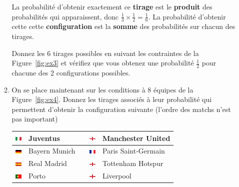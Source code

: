 \documentclass{../ficheTDTP}
\begin{document}
\begin{enumerate}
\begin{enumerate}
La probabilité d'obtenir exactement ce \textbf{tirage} est le \textbf{produit} des probabilités qui apparaissent, donc $\frac{1}{3} \times \frac{1}{2} = \frac{1}{6}$. 
La probabilité d'obtenir cette cette \textbf{configuration} est la \textbf{somme} des probabilités sur chacun des tirages.

Donnez les 6 tirages possibles en suivant les contraintes de la Figure~\ref{fig:ex3} et vérifiez que vous obtenez une probabilité $\frac{1}{2}$ pour chacune des 2 configurations possibles.

\item On se place maintenant sur les conditions à 8 équipes de la Figure~\ref{fig:ex4}. Donnez les tirages associés à leur probabilité qui permettent d'obtenir la configuration suivante (l'ordre des matchs n'est pas important)

\begin{tabular}{|clccl|}
\hline
\includegraphics[height=0.2cm]{flags/it.png} & Juventus & & \includegraphics[height=0.2cm]{flags/en.png} & Manchester United \\ \hline
\includegraphics[height=0.2cm]{flags/de.png} & Bayern Munich & & \includegraphics[height=0.2cm]{flags/fr.png} & Paris Saint-Germain \\ \hline
\includegraphics[height=0.2cm]{flags/es.png} & Real Madrid & & \includegraphics[height=0.2cm]{flags/en.png} & Tottenham Hotspur \\ \hline
\includegraphics[height=0.2cm]{flags/po.png} & Porto & & \includegraphics[height=0.2cm]{flags/en.png} & Liverpool \\ \hline
\end{tabular}


\end{enumerate}
\end{enumerate}
\end{document}
